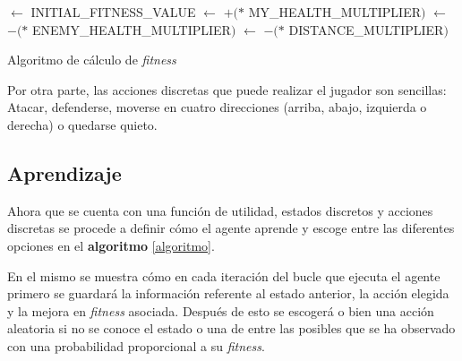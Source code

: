 \begin{algorithm}
	
	
	
	\Input{\PlayerHealth, \EnemyHealth, \Distance, \LookingAtEnemy, \NoWallsNear}
	\Output{\Fitness}
		
		
		\Fitness$\leftarrow$ INITIAL\_FITNESS\_VALUE\;
		\Fitness$\leftarrow$ \Fitness$+ ($\PlayerHealth$*$ MY\_HEALTH\_MULTIPLIER$)$\;
		\Fitness$\leftarrow$ \Fitness$- ($\EnemyHealth$*$ ENEMY\_HEALTH\_MULTIPLIER$)$\;
		\Fitness$\leftarrow$ \Fitness$- ($\Distance$*$ DISTANCE\_MULTIPLIER$)$\;
		
	

	\caption{Algoritmo de cálculo de \textit{fitness}}
	\label{algoritmo:fitness}
\end{algorithm}

\bigskip


\bigskip

Por otra parte, las acciones discretas que puede realizar el jugador son sencillas: Atacar, defenderse, moverse en cuatro direcciones (arriba, abajo, izquierda o derecha) o quedarse quieto.


\subsection{Aprendizaje}

Ahora que se cuenta con una función de utilidad, estados discretos y acciones discretas se procede a definir cómo el agente aprende y escoge entre las diferentes opciones en el \textbf{algoritmo} \ref{algoritmo}.

\bigskip


En el mismo se muestra cómo en cada iteración del bucle que ejecuta el agente primero se guardará la información referente al estado anterior, la acción elegida y la mejora en \textit{fitness} asociada. Después de esto se escogerá o bien una acción aleatoria si no se conoce el estado o una de entre las posibles que se ha observado con una probabilidad proporcional a su \textit{fitness}.

